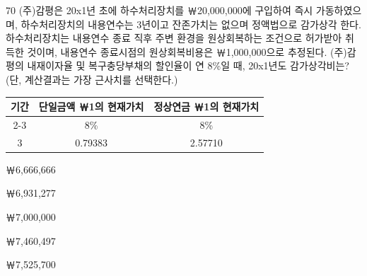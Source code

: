 \begin{question}{70}
(주)감평은 20x1년 초에 하수처리장치를 ￦20,000,000에 구입하여 즉시 가동하였으며, 하수처리장치의 내용연수는 3년이고 잔존가치는 없으며 정액법으로 감가상각 한다. 하수처리장치는 내용연수 종료 직후 주변 환경을 원상회복하는 조건으로 허가받아 취득한 것이며, 내용연수 종료시점의 원상회복비용은 ￦1,000,000으로 추정된다. (주)감평의 내재이자율 및 복구충당부채의 할인율이 연 8\%일 때, 20x1년도 감가상각비는? (단, 계산결과는 가장 근사치를 선택한다.)
\par{\small\centering
\begin{tabular}{|c|c|c|}
\hline
\multirow{2}{*}{기간} & 단일금액 ￦1의 현재가치 & 정상연금 ￦1의 현재가치 \\ \cline{2-3}
 & 8\% & 8\% \\ \hline
3 & 0.79383 & 2.57710 \\ \hline
\end{tabular}\par}
\begin{choices}
  \item ￦6,666,666
  \item ￦6,931,277
  \item ￦7,000,000
  \item ￦7,460,497
  \item ￦7,525,700
\end{choices}
\end{question}
